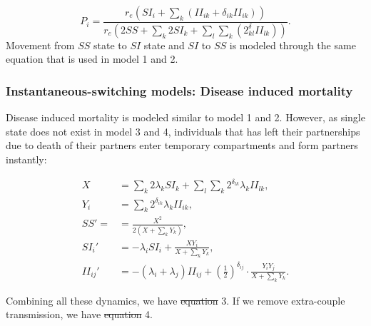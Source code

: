 \documentclass[10pt,letterpaper]{article}
\newcommand{\khalf}{\left(\frac{1}{2}\right)^{\delta_{ij}}}  %
\providecommand{\DIFaddtex}[1]{{\protect\color{blue}\uwave{#1}}} %
\providecommand{\DIFdeltex}[1]{{\protect\color{red}\sout{#1}}}                      %
\providecommand{\DIFaddbegin}{} %
\providecommand{\DIFaddend}{} %
\providecommand{\DIFdelbegin}{} %
\providecommand{\DIFdelend}{} %
\providecommand{\DIFadd}[1]{\texorpdfstring{\DIFaddtex{#1}}{#1}} %
\providecommand{\DIFdel}[1]{\texorpdfstring{\DIFdeltex{#1}}{}} %
\newcommand{\DIFscaledelfig}{0.5}
\newlength{\DIFdelgraphicswidth} %
\newlength{\DIFdelgraphicsheight} %
\newcommand{\DIFaddincludegraphics}[2][]{{\color{blue}\fbox{\DIFOincludegraphics[#1]{#2}}}} %
\newcommand{\DIFdelincludegraphics}[2][]{%
\sbox{\DIFdelgraphicsbox}{\DIFOincludegraphics[#1]{#2}}%
\settoboxwidth{\DIFdelgraphicswidth}{\DIFdelgraphicsbox} %
\settoboxtotalheight{\DIFdelgraphicsheight}{\DIFdelgraphicsbox} %
\scalebox{\DIFscaledelfig}{%
\parbox[b]{\DIFdelgraphicswidth}{\usebox{\DIFdelgraphicsbox}\\[-\baselineskip] \rule{\DIFdelgraphicswidth}{0em}}\llap{\resizebox{\DIFdelgraphicswidth}{\DIFdelgraphicsheight}{%
\setlength{\unitlength}{\DIFdelgraphicswidth}%
\begin{picture}(1,1)%
\thicklines\linethickness{2pt} %
{\color[rgb]{1,0,0}\put(0,0){\framebox(1,1){}}}%
{\color[rgb]{1,0,0}\put(0,0){\line( 1,1){1}}}%
{\color[rgb]{1,0,0}\put(0,1){\line(1,-1){1}}}%
\end{picture}%
}\hspace*{3pt}}} %
} %
\DeclareRobustCommand{\DIFaddbegin}{\DIFOaddbegin \let\includegraphics\DIFaddincludegraphics} %
\DeclareRobustCommand{\DIFaddend}{\DIFOaddend \let\includegraphics\DIFOincludegraphics} %
\DeclareRobustCommand{\DIFdelbegin}{\DIFOdelbegin \let\includegraphics\DIFdelincludegraphics} %
\DeclareRobustCommand{\DIFdelend}{\DIFOaddend \let\includegraphics\DIFOincludegraphics} %
\begin{document}
\begin{equation}
P_i = \frac{r_e (SI_i + \sum_k (II_{ik} + \delta_{ik} II_{ik}))}{r_e(2 SS + \sum_k 2 SI_k + \sum_l \sum_k (2^\delta_{kl} II_{lk}) )}.
\end{equation}
Movement from $SS$ state to $SI$ state and $SI$ to $SS$ is modeled through the same equation that is used in model 1 and 2.

\subsubsection*{Instantaneous-switching models: Disease induced mortality}

Disease induced mortality is modeled similar to model 1 and 2. However, as single state does not exist in model 3 and 4, individuals that has left their partnerships due to death of their partners enter temporary compartments and form partners instantly:

\begin{equation}
\begin{aligned}
X &= \sum_k 2 \lambda_k SI_k + \sum_l \sum_k 2^{\delta_{lk}}  \lambda_k II_{lk}, \\
Y_i &=  \sum_k  2^{\delta_{ik}}  \lambda_k II_{ik}, \\
SS' = &= \frac{X^2}{2 (X + \sum_k Y_k)},\\
SI_i' &= - \lambda_i SI_i + \frac{X Y_i}{X + \sum_k Y_k},\\
II_{ij}' &= -(\lambda_i + \lambda_j) II_{ij} + \khalf \cdot \frac{Y_i Y_j}{X + \sum_k Y_k}.
\end{aligned}
\end{equation}

Combining all these dynamics, we have \DIFdelbegin \DIFdel{equation }\DIFdelend \DIFaddbegin \DIFadd{model }\DIFaddend 3. If we remove extra-couple transmission, we have \DIFdelbegin \DIFdel{equation }\DIFdelend \DIFaddbegin \DIFadd{model }\DIFaddend 4.
\end{document}
